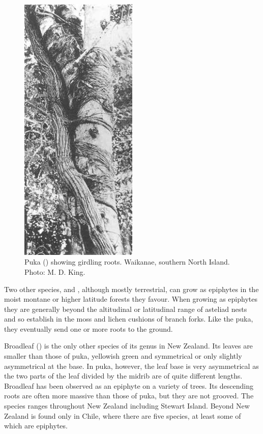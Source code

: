\begin{figure}
	\includegraphics[width=0.5\textwidth]{graphics/figure48puka-roots.jpg}
	\centering
	\caption[]{Puka () showing girdling roots.
	Waikanae, southern North Island.
	Photo: M. D. King.}%
	\label{fig:48puka-roots}
\end{figure}

Two other species,  and , although mostly terrestrial, can grow as epiphytes in the moist montane or higher latitude forests they favour.
When growing as epiphytes they are generally beyond the altitudinal or latitudinal range of asteliad nests and so establish in the moss and lichen cushions of branch forks.
Like the puka, they eventually send one or more roots to the ground.

Broadleaf () is the only other species of its genus in New Zealand.
Its leaves are smaller than those of puka, yellowish green and symmetrical or only slightly asymmetrical at the base.
In puka, however, the leaf base is very asymmetrical as the two parts of the leaf divided by the midrib are of quite different lengths.
Broadleaf has been observed as an epiphyte on a variety of trees.
Its descending roots are often more massive than those of puka, but they are not grooved.
The species ranges throughout New Zealand including Stewart Island.
Beyond New Zealand  is found only in Chile, where there are five species, at least some of which are epiphytes.

